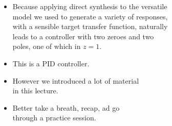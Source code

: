 \begin{frame}\mccz
{}
\myPause
 \begin{columns}
   \begin{itemize}[<+-| alert@+>]
   \item Because applying direct synthesis to the versatile\\
         model we used to generate a variety of responses,\\
         with a sensible target transfer function, naturally\\
         leads to a controller with two zeroes and two\\
         poles, one of which in $z=1$.
   \item This is a PID controller.
   \item However we introduced a lot of material\\
         in this lecture.
   \item Better take a breath, recap, ad go\\
         through a practice session.
   \end{itemize}
 \end{columns}
\end{frame}




